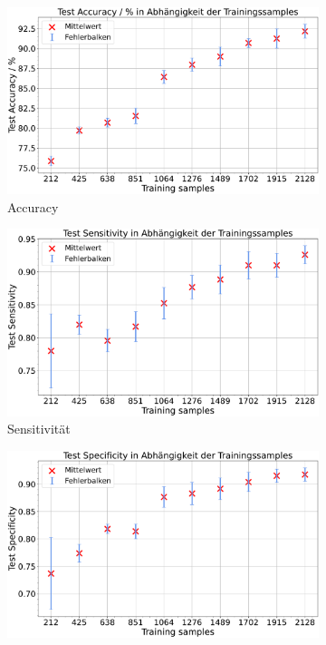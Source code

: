 \begin{figure}[H]
  \centering
  \begin{subfigure}[b]{0.48\textwidth}
    \centering
    \includegraphics[width=\textwidth]{plots/Augm-Gli-Men_Accuracy_mean.pdf}
    \caption{Accuracy}
    \label{fig:augm-acc}
  \end{subfigure}
  \begin{subfigure}[b]{0.48\textwidth}
    \centering
    \includegraphics[width=\textwidth]{plots/Augm-Gli-Men_Sensitivity_mean.pdf}
    \caption{Sensitivität}
    \label{fig:augm-sens}
  \end{subfigure}
  \begin{subfigure}[b]{0.48\textwidth}
    \centering
    \includegraphics[width=\textwidth]{plots/Augm-Gli-Men_Specificity_mean.pdf}

\end{subfigure}
\end{figure}
